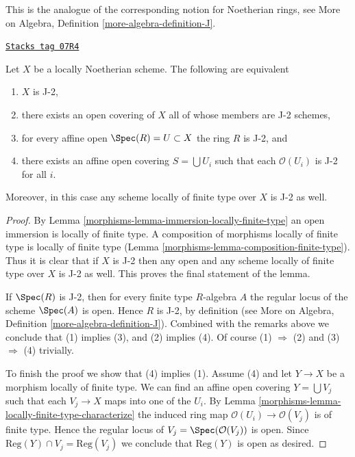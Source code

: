 This is the analogue of the corresponding notion for Noetherian
rings, see More on Algebra, Definition \ref{more-algebra-definition-J}.

\begin{lemma}[J]
\label{morphisms-lemma-J}
\href{https://stacks.math.columbia.edu/tag/07R4}{\texttt{Stacks tag 07R4}}

Let $X$ be a locally Noetherian scheme. The following are equivalent
\begin{enumerate}
\item $X$ is J-2,
\item there exists an open covering of $X$ all of whose members are
J-2 schemes,
\item for every affine open $\Spec(R) = U \subset X$ the ring
$R$ is J-2, and
\item there exists an affine open covering $S = \bigcup U_i$ such
that each $\mathcal{O}(U_i)$ is J-2 for all $i$.
\end{enumerate}
Moreover, in this case any scheme locally of finite type over $X$
is J-2 as well.
\end{lemma}

\begin{proof}

By Lemma \ref{morphisms-lemma-immersion-locally-finite-type} an open immersion
is locally of finite type. A composition of morphisms locally of
finite type is locally of finite type
(Lemma \ref{morphisms-lemma-composition-finite-type}). Thus it is clear that if $X$ is
J-2 then any open and any scheme locally of finite
type over $X$ is J-2 as well. This proves the final
statement of the lemma.

\medskip\noindent
If $\Spec(R)$ is J-2, then for every finite type $R$-algebra $A$
the regular locus of the scheme $\Spec(A)$ is open. Hence $R$ is
J-2, by definition (see
More on Algebra, Definition \ref{more-algebra-definition-J}).
Combined with the remarks above we conclude that (1) implies (3), and
(2) implies (4). Of course (1) $\Rightarrow$ (2) and
(3) $\Rightarrow$ (4) trivially.

\medskip\noindent
To finish the proof we show that (4) implies (1).
Assume (4) and let $Y \to X$ be a morphism locally of finite type.
We can find an affine open covering $Y = \bigcup V_j$ such that
each $V_j \to X$ maps into one of the $U_i$. By
Lemma \ref{morphisms-lemma-locally-finite-type-characterize}
the induced ring map $\mathcal{O}(U_i) \to \mathcal{O}(V_j)$ is
of finite type. Hence the regular locus of
$V_j = \Spec(\mathcal{O}(V_j))$ is open. Since
$\text{Reg}(Y) \cap V_j = \text{Reg}(V_j)$ we conclude that
$\text{Reg}(Y)$ is open as desired.
\end{proof}

